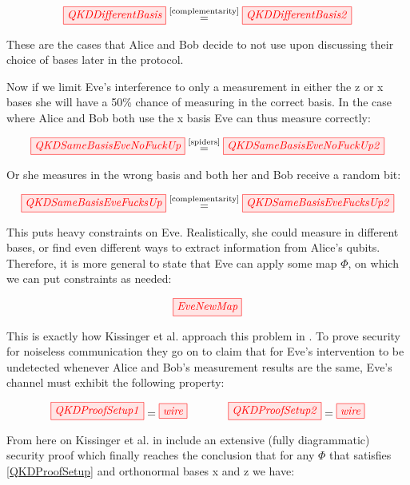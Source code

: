 \documentclass[]{article}
\newcommand{\equaltext}[1]{\ensuremath{\stackrel{\text{#1}}{=}}}
\begin{document}
\begin{equation}
\tikzfig{QKDDifferentBasis} \equaltext{\ref{complementarity}} \tikzfig{QKDDifferentBasis2}
\end{equation}

These are the cases that Alice and Bob decide to not use upon discussing their choice of bases later in the protocol.

Now if we limit Eve's interference to only a measurement in either the z or x bases she will have a 50\% chance of measuring in the correct basis. In the case where Alice and Bob both use the x basis Eve can thus measure correctly:

\begin{equation}
	\tikzfig{QKDSameBasisEveNoFuckUp} \equaltext{\ref{spiders}} \tikzfig{QKDSameBasisEveNoFuckUp2} 
\end{equation}

Or she measures in the wrong basis and both her and Bob receive a random bit:

\begin{equation}
	\tikzfig{QKDSameBasisEveFucksUp} \equaltext{\ref{complementarity}} \tikzfig{QKDSameBasisEveFucksUp2}
\end{equation}

This puts heavy constraints on Eve. Realistically, she could measure in different bases, or find even different ways to extract information from Alice's qubits. Therefore, it is more general to state that Eve can apply some map $\Phi$, on which we can put constraints as needed:

\begin{equation}
	\tikzfig{EveNewMap}
\end{equation}

This is exactly how Kissinger et al. approach this problem in \cite{Kissinger2017}. To prove security for noiseless communication they go on to claim that for Eve's intervention to be undetected whenever Alice and Bob's measurement results are the same, Eve's channel must exhibit the following property:

\begin{equation}
	\label{QKDProofSetup}
	\tikzfig{QKDProofSetup1} = \tikzfig{wire} ~~~~~~~~~~~ \tikzfig{QKDProofSetup2} = \tikzfig{wire}
\end{equation}

From here on Kissinger et al. in \cite{Kissinger2017} include an extensive (fully diagrammatic) security proof which finally reaches the conclusion that for any $\Phi$ that satisfies \ref{QKDProofSetup} and orthonormal bases x and z we have:
\end{document}
